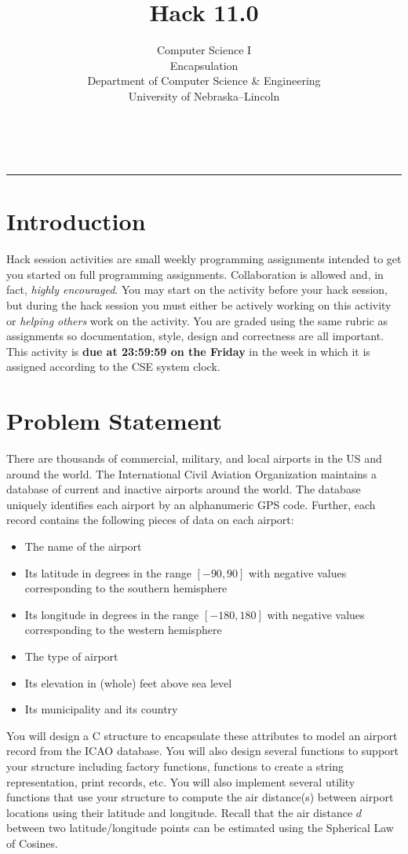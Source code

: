 \documentclass[12pt]{scrartcl}
\title{Hack 11.0}\let\Title\@title
\subtitle{Computer Science I\\
Encapsulation\\
{\small
\vskip1cm
Department of Computer Science \& Engineering \\
University of Nebraska--Lincoln}
\vskip-3cm}
\date{~}
\begin{document}
\maketitle

\hrule

\section*{Introduction}

Hack session activities are small weekly programming assignments intended
to get you started on full programming assignments.  Collaboration is allowed
and, in fact, \emph{highly encouraged}.  You may start on the activity before
your hack session, but during the hack session you must either be actively 
working on this activity or \emph{helping others} work on the activity.
You are graded using the same rubric as assignments so documentation, style, 
design and correctness are all important.  This activity is \textbf{due 
at 23:59:59 on the Friday} in the week in which it is assigned according 
to the CSE system clock.

\section*{Problem Statement}

There are thousands of commercial, military, and local airports in the US and
around the world.  The International Civil Aviation Organization maintains a
database of current and inactive airports around the world.  The database 
uniquely identifies each airport by an alphanumeric GPS code.  Further, each
record contains the following pieces of data on each airport:
\begin{itemize}
  \item The name of the airport
  \item Its latitude in degrees in the range $[-90, 90]$ with negative values corresponding to the southern hemisphere
  \item Its longitude in degrees in the range $[-180, 180]$ with negative values corresponding to the western hemisphere
  \item The type of airport 
  \item Its elevation in (whole) feet above sea level
  \item Its municipality and its country
\end{itemize}

You will design a C structure to encapsulate these attributes to model an
airport record from the ICAO database.  You will also design several functions
to support your structure including factory functions, functions to 
create a string representation, print records, etc. You will also implement
several utility functions that use your structure to compute the air
distance(s) between airport locations using their latitude and longitude.
Recall that the air distance $d$ between two latitude/longitude points can be 
estimated using the Spherical Law of Cosines.
\end{document}
